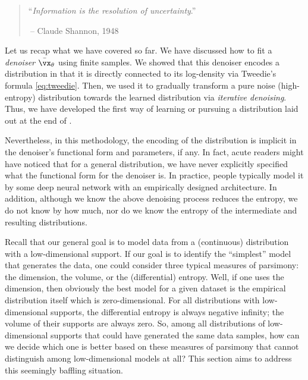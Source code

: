 \documentclass[../../book-main.tex]{subfiles}
\begin{document}
\begin{quote}
\hfill  ``{\em Information is the resolution of uncertainty}.''

$~$\hfill -- Claude Shannon, 1948
\end{quote}



\vspace{5mm}



Let us recap what we have covered so far. We have discussed how to fit a \textit{denoiser} \(\bar{\vx}_{\theta}\) using finite samples. We showed that this denoiser encodes a distribution in that it is directly connected to its log-density via Tweedie's formula \eqref{eq:tweedie}. Then, we used it to gradually transform a pure noise (high-entropy) distribution towards the learned distribution via \textit{iterative denoising}. Thus, we have developed the first way of learning or pursuing a distribution laid out at the end of .

Nevertheless, in this methodology, the encoding of the distribution is implicit in the denoiser's functional form and parameters, if any. In fact, acute readers might have noticed that for a general distribution, we have never explicitly specified what the functional form for the denoiser is. In practice, people typically model it by some deep neural network with an empirically designed architecture. In addition, although we know the above denoising process reduces the entropy, we do not know by how much, nor do we know the entropy of the intermediate and resulting distributions. 

Recall that our general goal is to model data from a (continuous) distribution
with a low-dimensional support. If our goal is to identify the ``simplest''
model that generates the data, one could consider three typical measures of
parsimony: the dimension, the volume, or the (differential) entropy. Well, if
one uses the dimension, then obviously the best model for a given dataset is the
empirical distribution itself which is zero-dimensional. For all distributions with low-dimensional supports, the differential entropy is always negative infinity; the volume of their supports are always zero. So,  among all distributions of low-dimensional supports that could have generated the same data samples, how can we decide which one is better based on these measures of parsimony that cannot distinguish among low-dimensional models at all? This section aims to address this seemingly baffling situation.
\end{document}
